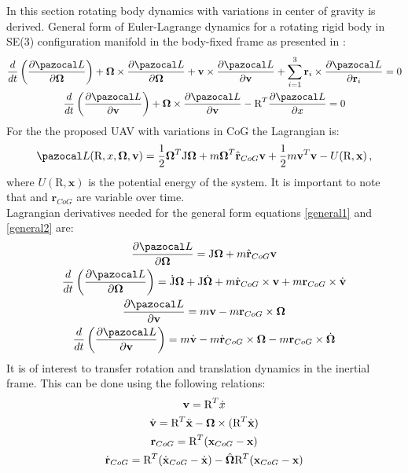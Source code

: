 In this section rotating body dynamics with variations in center of gravity is derived.
General form of Euler-Lagrange dynamics for a rotating rigid body in SE(3) configuration manifold in the body-fixed frame as presented in \cite{LeeModel}:
\begin{gather}
	\frac{d}{dt} \left( \frac{\partial \La}{\partial \mb{\Omega}} \right)
	+ \mb{\Omega} \times \frac{\partial \La}{\partial \mb{\Omega}} 
	+ \textbf{v} \times \frac{\partial \La}{\partial \textbf{v}} 
	+ \sum_{i=1}^{3} \textbf{r}_i \times \frac{\partial \La}{\partial \textbf{r}_i} = 0 \label{general1}\\
	\frac{d}{dt} \left( \frac{\partial \La}{\partial \textbf{v}} \right)
	+ \mb{\Omega} \times \frac{\partial \La}{\partial \textbf{v}} 
	- \text{R}^T \frac{\partial \La}{\partial x} = 0 \label{general2}
\end{gather}
For the the proposed UAV with variations in CoG the Lagrangian is:
\begin{equation}
	\La(\text{R},x,\mb{\Omega},\textbf{v}) = \frac{1}{2}\mb{\Omega}^T\text{J}\mb{\Omega} + m \mb{\Omega}^T \hat{\textbf{r}}_{CoG}\textbf{v} + \frac{1}{2}m\textbf{v}^T\textbf{v} - U(\text{R},\textbf{x}) \, ,
\end{equation}
where $U(\text{R}, \textbf{x})$ is the potential energy of the system. It is important to note that  and $\textbf{r}_{CoG}$ are variable over time. \\
Lagrangian derivatives needed for the general form equations \ref{general1} and \ref{general2} are:
\begin{gather}
	\frac{\partial \La}{\partial \mb{\Omega}} = \text{J}\mb{\Omega} + m \hat{\textbf{r}}_{CoG}\textbf{v} \label{d1}\\ 
	\frac{d}{dt} \left( \frac{\partial \La}{\partial \mb{\Omega}} \right) = \dot{\text{J}} \mb{\Omega} + \text{J} \dot{\mb{\Omega}} + m \dot{\textbf{r}}_{CoG} \times \textbf{v} + m \textbf{r}_{CoG} \times \dot{\textbf{v}} \label{d2}\\ 
	\frac{\partial \La}{\partial \textbf{v}} = m\textbf{v} - m\textbf{r}_{CoG} \times \mb{\Omega} \label{d3}\\ 
	\frac{d}{dt} \left( \frac{\partial \La}{\partial \textbf{v}} \right) = m\dot{\textbf{v}} - m\dot{\textbf{r}}_{CoG} \times \mb{\Omega} - m \textbf{r}_{CoG} \times \dot{\mb{\Omega}} \label{d4}
\end{gather}
It is of interest to transfer rotation and translation dynamics in the inertial frame. This can be done using the following relations:
\begin{gather}
	\textbf{v} = \text{R}^T \dot{x} \label{inertial1}\\
	\dot{\textbf{v}} = \text{R}^T \ddot{\textbf{x}} - \boldsymbol{\Omega} \times (\text{R}^T \dot{\textbf{x}} ) \label{inertial2} \\
	\textbf{r}_{CoG} = \text{R}^T(\textbf{x}_{CoG} - \textbf{x}) \label{inertial3} \\
	\dot{\textbf{r}}_{CoG} = \text{R}^T(\dot{\textbf{x}}_{CoG} - \dot{\textbf{x}}) - \hat{\boldsymbol{\Omega}}\text{R}^T(\textbf{x}_{CoG} - \textbf{x}) \label{inertial4}
\end{gather}
